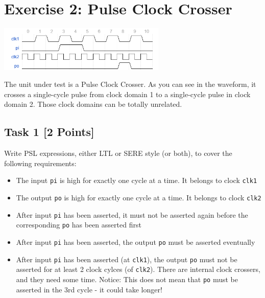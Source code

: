 \documentclass[12pt,epsf,makeidx,oneside]{book}
\begin{document}
%  
\section{Exercise 2: Pulse Clock Crosser}
\begin{center}
  \includegraphics[width=0.6\textwidth]{ex2}
\end{center}
The unit under test is a Pulse Clock Crosser. As you can see in the waveform, it crosses a single-cycle pulse
from clock domain 1 to a single-cycle pulse in clock domain 2. Those clock domains can be totally unrelated.

\subsection{Task 1 [2 Points]}
Write PSL expressions, either LTL or SERE style (or both), to cover the following requirements:
\begin{itemize}
  \item The input {\tt pi} is high for exactly one cycle at a time. It belongs to clock {\tt clk1}
  \item The output {\tt po} is high for exactly one cycle at a time. It belongs to clock {\tt clk2}
  \item After input {\tt pi} has been asserted, it must not be asserted again before the corresponding {\tt po} has been asserted first
  \item After input {\tt pi} has been asserted, the output {\tt po} must be asserted eventually
  \item After input {\tt pi} has been asserted (at {\tt clk1}), the output {\tt po} must not be asserted for at least 2 clock cylces (of {\tt clk2}). There are internal clock crossers, and they need some time. Notice: This does not mean that {\tt po} must be asserted in the 3rd cycle - it could take longer!
\end{itemize}


\end{document}
